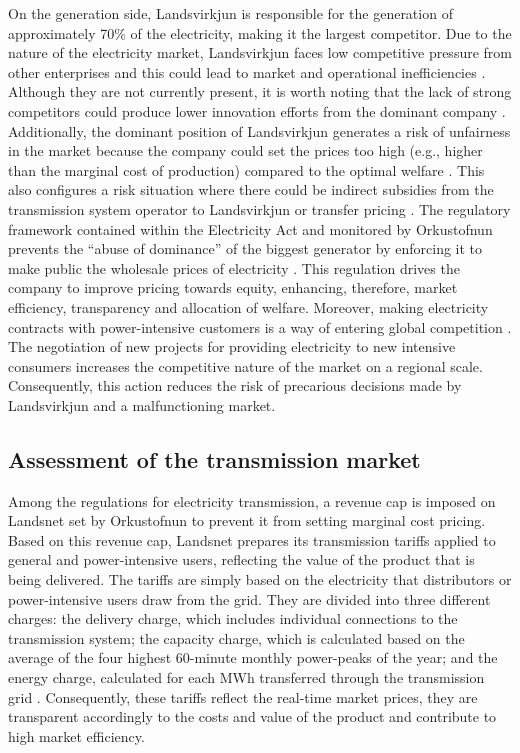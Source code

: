 \documentclass[svn, final]{rureport}
\begin{document}
On the generation side, Landsvirkjun is responsible for the generation of approximately 70\% of the electricity, making it the largest competitor. Due to the nature of the electricity market, Landsvirkjun faces low competitive pressure from other enterprises and this could lead to market and operational inefficiencies \cite{copen_econ_energy_2017}. Although they are not currently present, it is worth noting that the lack of strong competitors could produce lower innovation efforts from the dominant company \cite{OECD_2014}. Additionally, the dominant position of Landsvirkjun generates a risk of unfairness in the market because the company could set the prices too high (e.g., higher than the marginal cost of production) compared to the optimal welfare \cite{our_energy_2016}. This also configures a risk situation where there could be indirect subsidies from the transmission system operator to Landsvirkjun or transfer pricing \cite{our_energy_2016}.   
The regulatory framework contained within the Electricity Act and monitored by Orkustofnun prevents the “abuse of dominance” of the biggest generator by enforcing it to make public the wholesale prices of electricity \cite{orkustofnun_2011}. This regulation drives the company to improve pricing towards equity, enhancing, therefore, market efficiency, transparency and allocation of welfare. Moreover, making electricity contracts with power-intensive customers is a way of entering global competition \cite{our_energy_2016}. The negotiation of new projects for providing electricity to new intensive consumers increases the competitive nature of the market on a regional scale. Consequently, this action reduces the risk of precarious decisions made by Landsvirkjun and a malfunctioning market. 

\subsection{Assessment of the transmission market}

Among the regulations for electricity transmission, a revenue cap is imposed on Landsnet set by Orkustofnun to prevent it from setting marginal cost pricing. Based on this revenue cap, Landsnet prepares its transmission tariffs applied to general and power-intensive users, reflecting the value of the product that is being delivered. The tariffs are simply based on the electricity that distributors or power-intensive users draw from the grid. They are divided into three different charges: the delivery charge, which includes individual connections to the transmission system; the capacity charge, which is calculated based on the average of the four highest 60-minute monthly power-peaks of the year; and the energy charge, calculated for each MWh transferred through the transmission grid \cite{landsnet_tariffs}. Consequently, these tariffs reflect the real-time market prices, they are transparent accordingly to the costs and value of the product and contribute to high market efficiency. 
\end{document}
